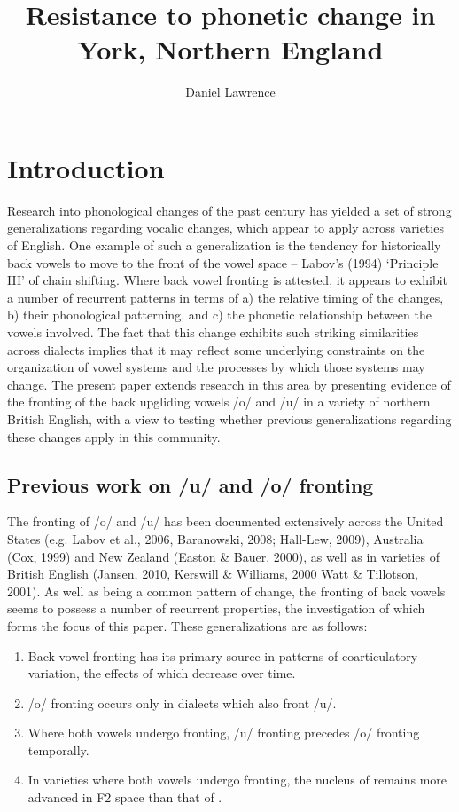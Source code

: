 \documentclass[12pt]{article}
\title{Resistance to phonetic change in York, Northern England}
\author{Daniel Lawrence}
\begin{document}
\maketitle

\section{Introduction}

Research into phonological changes of the past century has yielded a set of strong generalizations regarding vocalic changes, which appear to apply across varieties of English. One example of such a generalization is the tendency for historically back vowels to move to the front of the vowel space -- Labov's (1994) `Principle III' of chain shifting. Where back vowel fronting is attested, it appears to exhibit a number of recurrent patterns in terms of a) the relative timing of the changes, b) their phonological patterning, and c) the phonetic relationship between the vowels involved. The fact that this change exhibits such striking similarities across dialects implies that it may reflect some underlying constraints on the organization of vowel systems and the processes by which those systems may change. The present paper extends research in this area by presenting evidence of the fronting of the back upgliding vowels /o/ and /u/ in a variety of northern British English, with a view to testing whether previous generalizations regarding these changes apply in this community.

\subsection{Previous work on /u/ and /o/ fronting}

The fronting of /o/ and /u/  has been documented extensively across the United States (e.g. Labov et al., 2006, Baranowski, 2008; Hall-Lew, 2009), Australia (Cox, 1999) and New Zealand (Easton \& Bauer, 2000), as well as in varieties of British English (Jansen, 2010, Kerswill \& Williams, 2000 Watt \& Tillotson, 2001). As well as being a common pattern of change, the fronting of back vowels seems to possess a number of recurrent properties, the investigation of which forms the focus of this paper. These generalizations are as follows:

\begin{enumerate}
\item{Back vowel fronting has its primary source in patterns of coarticulatory variation, the effects of which decrease over time.}
\item{/o/ fronting occurs only in dialects which also front /u/.}
\item{Where both vowels undergo fronting, /u/ fronting precedes /o/ fronting temporally.}
\item{In varieties where both vowels undergo fronting, the nucleus of  remains more advanced in F2 space than that of .}
\end{enumerate}
\end{document}
